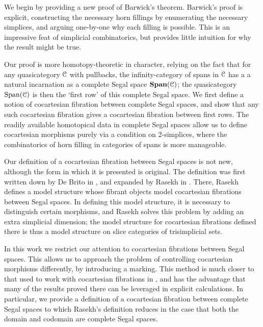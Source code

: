 \documentclass[main.tex]{subfiles}
\begin{document}
We begin by providing a new proof of Barwick's theorem. Barwick's proof is explicit, constructing the necessary horn fillings by enumerating the necessary simplices, and arguing one-by-one why each filling is possible. This is an impressive feat of simplicial combinatorics, but provides little intuition for why the result might be true.

Our proof is more homotopy-theoretic in character, relying on the fact that for any quasicategory $\mathcal{C}$ with pullbacks, the infinity-category of spans in $\mathcal{C}$ has a a natural incarnation as a complete Segal space $\mathbf{Span}(\mathcal{C})$; the quasicategory $\mathrm{Span}(\mathcal{C})$ is then the `first row' of this complete Segal space. We first define a notion of cocartesian fibration between complete Segal spaces, and show that any such cocartesian fibration gives a cocartesian fibration between first rows. The readily available homotopical data in complete Segal spaces allow us to define cocartesian morphisms purely via a condition on 2-simplices, where the combinatorics of horn filling in categories of spans is more manageable.

Our definition of a cocartesian fibration between Segal spaces is not new, although the form in which it is presented is original. The definition was first written down by De Brito in \cite{2016arXiv160500706B}, and expanded by Rasekh in \cite{rasekhcartesianfibrations}. There, Rasekh defines a model structure whose fibrant objects model cocartesian fibrations between Segal spaces. In defining this model structure, it is necessary to distinguish certain morphisms, and Rasekh solves this problem by adding an extra simplicial dimension; the model structure for cocartesian fibrations defined there is thus a model structure on slice categories of trisimplicial sets.

In this work we restrict our attention to cocartesian fibrations between Segal spaces. This allows us to approach the problem of controlling cocartesian morphisms differently, by introducing a marking. This method is much closer to that used to work with cocartesian fibrations in \cite{highertopostheory}, and has the advantage that many of the results proved there can be leveraged in explicit calculations. In particular, we provide a definition of a cocartesian fibration between complete Segal spaces to which Rasekh's definition reduces in the case that both the domain and codomain are complete Segal spaces.
\end{document}
